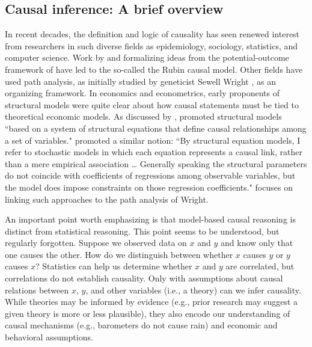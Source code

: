 \documentclass[11pt,reqno,titlepage]{amsart}
\begin{document}
\begin{doublespace}
\subsection{Causal inference: A brief overview}
In recent decades, the definition and logic of causality has seen renewed interest from researchers in such diverse fields as epidemiology, sociology, statistics, and computer science. 
Work by \citet{Rubin:1974im,Rubin:1977dv} and \citet{Holland:1986p7458} formalizing ideas from the potential-outcome framework of \citet{Neyman:1923aa} have led to the so-called the Rubin causal model. 
Other fields have used path analysis, as initially studied by geneticist Sewell Wright \citep{Wright:1921:aa}, as an organizing framework.
In economics and econometrics, early proponents of structural models were quite clear about how causal statements must be tied to theoretical economic models.
As discussed by \citet{Heckman:2015ez}, \citet{Haavelmo:1943cl,Haavelmo:1944jq} promoted structural models ``based on a system of structural equations that define causal relationships among a set of variables."
\citet[p.\,979]{Goldberger:1972cq} promoted a similar notion: ``By structural equation models, I refer to stochastic models in which each equation represents a causal link, rather than a mere empirical association \dots
Generally speaking the structural parameters do not coincide with coefficients of regressions among observable variables, but the model does impose constraints on those regression coefficients."
\citet{Goldberger:1972cq} focuses on linking such approaches to the path analysis of Wright.

An important point worth emphasizing is that model-based causal reasoning is distinct from statistical reasoning. 
This point seems to be understood, but regularly forgotten.
Suppose we observed data on $x$ and $y$ and know only that one causes the other. How do we distinguish between whether $x$ causes $y$ or $y$ causes $x$? 
Statistics can help us determine whether $x$ and $y$ are correlated, but correlations do not establish causality.
Only with assumptions about causal relations between $x$, $y$, and other variables (i.e., a theory) can we infer causality.
While theories may be informed by evidence (e.g., prior research may suggest a given theory is more or less plausible), they also encode our understanding of causal mechanisms (e.g., barometers do not cause rain) and economic and behavioral assumptions.


\end{doublespace}
\end{document}
